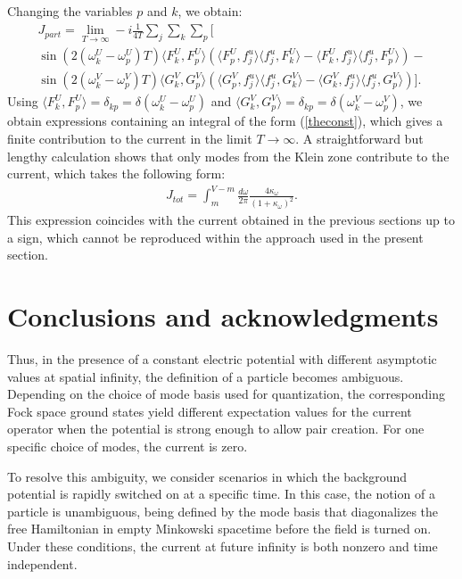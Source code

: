 \documentclass[12pt]{article}
\numberwithin{equation}{section}
\begin{document}
Changing the variables $p$ and $k$, we obtain:
\begin{gather}
\label{current 2}
J_{part} = \lim_{T\to \infty}  -i \frac{1}{4T} \sum_j \sum_k \sum_p  
     \Bigg[ \\ \nonumber 
     \sin \left(2 (\omega^U_k - \omega^U_p) T \right) \langle F^U_k, F^U_p \rangle \left( \langle F^U_p, f^u_j \rangle \langle f^u_j, F^U_k \rangle - \langle F^U_k, f^u_j \rangle \langle f^u_j, F^U_p \rangle \right)
     - \\ \nonumber
     \sin \left(2 (\omega^V_k - \omega^V_p) T \right) \langle G^V_k, G^V_p \rangle \left( \langle G^V_p, f^u_j \rangle \langle f^u_j, G^V_k \rangle - \langle G^V_k, f^u_j \rangle \langle f^u_j, G^V_p \rangle \right) \Bigg].
\end{gather}
Using $\langle F^U_k, F^U_p \rangle = \delta_{kp} = \delta(\omega^U_k - \omega^U_p)$ and $\langle G^V_k, G^V_p \rangle = \delta_{kp} = \delta(\omega^V_k - \omega^V_p)$, we obtain expressions containing an integral of the form (\ref{theconst}), which gives a finite contribution to the current in the limit $T \to \infty$. A straightforward but lengthy calculation shows that only modes from the Klein zone contribute to the current, which takes the following form:
\begin{align}
   \boxed{ J_{tot} = \int_{m}^{V - m} \frac{d\omega}{2\pi} \frac{4\kappa_{\omega}}{(1 + \kappa_{\omega})^2} }.
\end{align}
This expression coincides with the current obtained in the previous sections up to a sign, which cannot be reproduced within the approach used in the present section.

\section{Conclusions and acknowledgments}

Thus, in the presence of a constant electric potential with different asymptotic values at spatial infinity, the definition of a particle becomes ambiguous. Depending on the choice of mode basis used for quantization, the corresponding Fock space ground states yield different expectation values for the current operator when the potential is strong enough to allow pair creation. For one specific choice of modes, the current is zero.

To resolve this ambiguity, we consider scenarios in which the background potential is rapidly switched on at a specific time. In this case, the notion of a particle is unambiguous, being defined by the mode basis that diagonalizes the free Hamiltonian in empty Minkowski spacetime before the field is turned on. Under these conditions, the current at future infinity is both nonzero and time independent.
\end{document}
